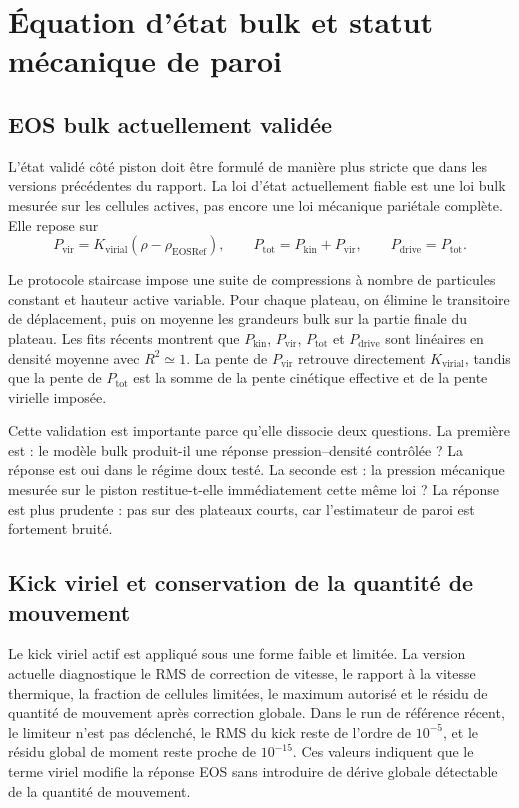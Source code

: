 \documentclass[11pt,a4paper]{article}
\begin{document}
\section{Équation d'état bulk et statut mécanique de paroi}

\subsection{EOS bulk actuellement validée}

L'état validé côté piston doit être formulé de manière plus stricte que dans les versions précédentes du rapport. La loi d'état actuellement fiable est une loi bulk mesurée sur les cellules actives, pas encore une loi mécanique pariétale complète. Elle repose sur
\begin{equation}
  P_{\mathrm{vir}} = K_{\mathrm{virial}}(\rho-\rho_{\mathrm{EOSRef}}),
  \qquad
  P_{\mathrm{tot}} = P_{\mathrm{kin}}+P_{\mathrm{vir}},
  \qquad
  P_{\mathrm{drive}}=P_{\mathrm{tot}}.
\end{equation}

Le protocole staircase impose une suite de compressions à nombre de particules constant et hauteur active variable. Pour chaque plateau, on élimine le transitoire de déplacement, puis on moyenne les grandeurs bulk sur la partie finale du plateau. Les fits récents montrent que \(P_{\mathrm{kin}}\), \(P_{\mathrm{vir}}\), \(P_{\mathrm{tot}}\) et \(P_{\mathrm{drive}}\) sont linéaires en densité moyenne avec \(R^2\simeq1\). La pente de \(P_{\mathrm{vir}}\) retrouve directement \(K_{\mathrm{virial}}\), tandis que la pente de \(P_{\mathrm{tot}}\) est la somme de la pente cinétique effective et de la pente virielle imposée.

Cette validation est importante parce qu'elle dissocie deux questions. La première est : le modèle bulk produit-il une réponse pression--densité contrôlée ? La réponse est oui dans le régime doux testé. La seconde est : la pression mécanique mesurée sur le piston restitue-t-elle immédiatement cette même loi ? La réponse est plus prudente : pas sur des plateaux courts, car l'estimateur de paroi est fortement bruité.

\subsection{Kick viriel et conservation de la quantité de mouvement}

Le kick viriel actif est appliqué sous une forme faible et limitée. La version actuelle diagnostique le RMS de correction de vitesse, le rapport à la vitesse thermique, la fraction de cellules limitées, le maximum autorisé et le résidu de quantité de mouvement après correction globale. Dans le run de référence récent, le limiteur n'est pas déclenché, le RMS du kick reste de l'ordre de \(10^{-5}\), et le résidu global de moment reste proche de \(10^{-15}\). Ces valeurs indiquent que le terme viriel modifie la réponse EOS sans introduire de dérive globale détectable de la quantité de mouvement.
\end{document}
